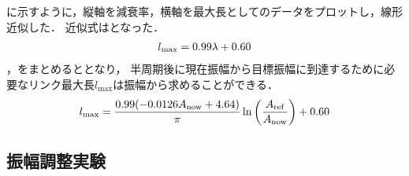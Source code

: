           \figref{}に示すように，縦軸を減衰率，横軸を最大長としてのデータをプロットし，線形近似した．
          近似式はとなった．
          \begin{eqnarray}
            \equlabel{length relation}
            l_{\mathrm{max}}=0.99\lambda+0.60
          \end{eqnarray}
          ，をまとめるととなり，
          半周期後に現在振幅から目標振幅に到達するために必要なリンク最大長$l_{\mathrm{max}}$は振幅から求めることができる．
          \begin{eqnarray}
            \equlabel{l status}
            l_{\mathrm{max}}=\frac{0.99(-0.0126A_{\mathrm{now}}+4.64)}{\pi}\ln{\left(\frac{A_{\mathrm{ref}}}{A_{\mathrm{now}}}\right)}+0.60
          \end{eqnarray}
          
        \subsection{振幅調整実験}
        
